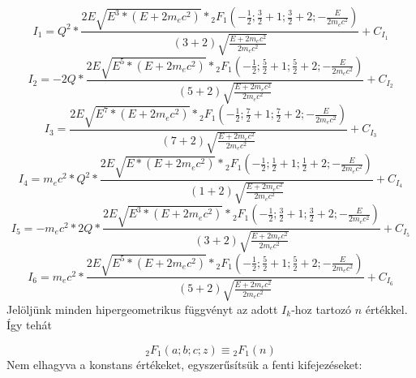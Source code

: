 \begin{equation} \label{eq:42}
I_{1}
=
Q^{2}
*
\frac{2 E \sqrt{E^{3} * \left( E + 2m_{e}c^{2} \right)} * {}_{2}F_{1} \left( -\frac{1}{2}; \frac{3}{2} + 1; \frac{3}{2} + 2; -\frac{E}{2m_{e}c^{2}} \right)}{\left( 3 + 2 \right) \sqrt{\frac{E + 2m_{e}c^{2}}{2m_{e}c^{2}}}} + C_{I_{1}}
\end{equation}
\begin{equation} \label{eq:43}
I_{2}
=
- 2Q
*
\frac{2 E \sqrt{E^{5} * \left( E + 2m_{e}c^{2} \right)} * {}_{2}F_{1} \left( -\frac{1}{2}; \frac{5}{2} + 1; \frac{5}{2} + 2; -\frac{E}{2m_{e}c^{2}} \right)}{\left( 5 + 2 \right) \sqrt{\frac{E + 2m_{e}c^{2}}{2m_{e}c^{2}}}} + C_{I_{2}}
\end{equation}
\begin{equation} \label{eq:44}
I_{3}
=
\frac{2 E \sqrt{E^{7} * \left( E + 2m_{e}c^{2} \right)} * {}_{2}F_{1} \left( -\frac{1}{2}; \frac{7}{2} + 1; \frac{7}{2} + 2; -\frac{E}{2m_{e}c^{2}} \right)}{\left( 7 + 2 \right) \sqrt{\frac{E + 2m_{e}c^{2}}{2m_{e}c^{2}}}} + C_{I_{3}}
\end{equation}
\begin{equation} \label{eq:45}
I_{4}
=
m_{e}c^{2} * Q^{2}
*
\frac{2 E \sqrt{E * \left( E + 2m_{e}c^{2} \right)} * {}_{2}F_{1} \left( -\frac{1}{2}; \frac{1}{2} + 1; \frac{1}{2} + 2; -\frac{E}{2m_{e}c^{2}} \right)}{\left( 1 + 2 \right) \sqrt{\frac{E + 2m_{e}c^{2}}{2m_{e}c^{2}}}} + C_{I_{4}}
\end{equation}
\begin{equation} \label{eq:46}
I_{5}
=
- m_{e}c^{2} * 2Q
*
\frac{2 E \sqrt{E^{3} * \left( E + 2m_{e}c^{2} \right)} * {}_{2}F_{1} \left( -\frac{1}{2}; \frac{3}{2} + 1; \frac{3}{2} + 2; -\frac{E}{2m_{e}c^{2}} \right)}{\left( 3 + 2 \right) \sqrt{\frac{E + 2m_{e}c^{2}}{2m_{e}c^{2}}}} + C_{I_{5}}
\end{equation}
\begin{equation} \label{eq:47}
I_{6}
=
m_{e}c^{2}
*
\frac{2 E \sqrt{E^{5} * \left( E + 2m_{e}c^{2} \right)} * {}_{2}F_{1} \left( -\frac{1}{2}; \frac{5}{2} + 1; \frac{5}{2} + 2; -\frac{E}{2m_{e}c^{2}} \right)}{\left( 5 + 2 \right) \sqrt{\frac{E + 2m_{e}c^{2}}{2m_{e}c^{2}}}} + C_{I_{6}}
\end{equation}
Jelöljünk minden hipergeometrikus függvényt az adott $I_{k}$-hoz tartozó $n$ értékkel. Így tehát

\begin{equation} \label{eq:48}
{}_{2}F_{1} \left( a; b; c; z \right)
\equiv
{}_{2}F_{1} \left( n \right)
\end{equation}
Nem elhagyva a konstans értékeket, egyszerűsítsük a fenti kifejezéseket:

